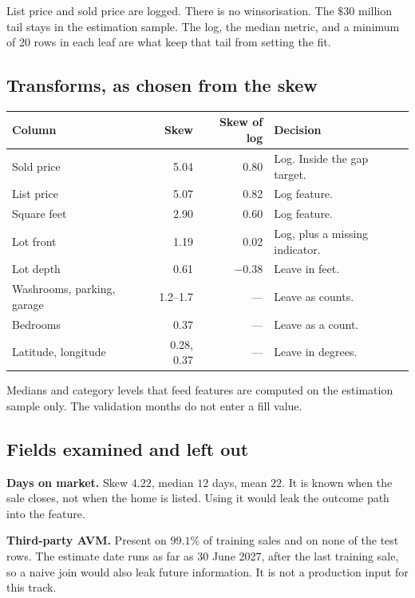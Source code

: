 \documentclass[11pt]{article}
\begin{document}
List price and sold price are logged. There is no winsorisation. The \(\$30\) million tail stays in the estimation sample. The log, the median metric, and a minimum of 20 rows in each leaf are what keep that tail from setting the fit.

\subsection{Transforms, as chosen from the skew}

\begin{center}
\begin{tabular}{lrrl}
\toprule
Column & Skew & Skew of log & Decision \\
\midrule
Sold price & 5.04 & 0.80 & Log. Inside the gap target. \\
List price & 5.07 & 0.82 & Log feature. \\
Square feet & 2.90 & 0.60 & Log feature. \\
Lot front & 1.19 & 0.02 & Log, plus a missing indicator. \\
Lot depth & 0.61 & \(-0.38\) & Leave in feet. \\
Washrooms, parking, garage & 1.2--1.7 & --- & Leave as counts. \\
Bedrooms & 0.37 & --- & Leave as a count. \\
Latitude, longitude & 0.28, 0.37 & --- & Leave in degrees. \\
\bottomrule
\end{tabular}
\end{center}

Medians and category levels that feed features are computed on the estimation sample only. The validation months do not enter a fill value.

\subsection{Fields examined and left out}
\label{sec:excluded}

\textbf{Days on market.} Skew \(4.22\), median \(12\) days, mean \(22\). It is known when the sale closes, not when the home is listed. Using it would leak the outcome path into the feature.

\textbf{Third-party AVM.} Present on \(99.1\%\) of training sales and on none of the test rows. The estimate date runs as far as 30 June 2027, after the last training sale, so a naive join would also leak future information. It is not a production input for this track.
\end{document}
